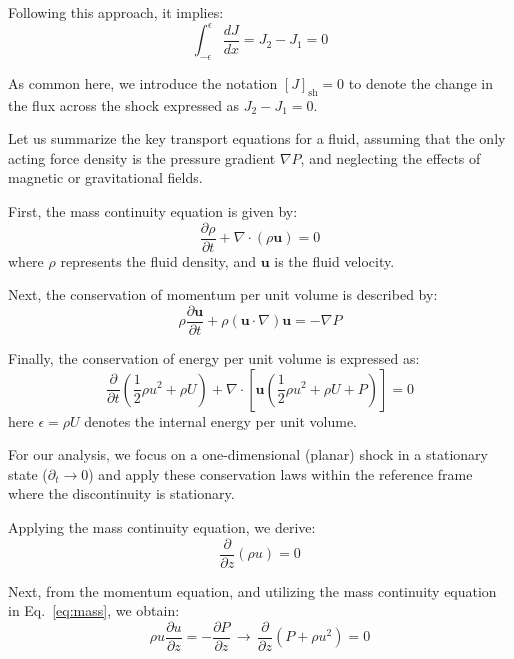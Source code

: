 Following this approach, it implies:
%
\begin{equation}
\int_{-\epsilon}^{\epsilon} \frac{dJ}{dx} = J_2 - J_1 = 0
\end{equation}

As common here, we introduce the notation \( [J]_{\text{sh}} = 0\) to denote the change in the flux across the shock expressed as \( J_2 - J_1 = 0 \). 

Let us summarize the key transport equations for a fluid, assuming that the only acting force density is the pressure gradient \( \nabla P \), and neglecting the effects of magnetic or gravitational fields.

First, the mass continuity equation is given by:
%
\begin{equation}
\frac{\partial \rho}{\partial t} + \nabla \cdot (\rho \mathbf{u}) = 0
\end{equation}
%
where \( \rho \) represents the fluid density, and \( \mathbf{u} \) is the fluid velocity.

Next, the conservation of momentum per unit volume is described by:
%
\begin{equation}
\rho \frac{\partial \mathbf{u}}{\partial t} + \rho (\mathbf{u} \cdot \nabla) \mathbf{u} = -\nabla P
\end{equation}

Finally, the conservation of energy per unit volume is expressed as:
%
\begin{equation}
\frac{\partial}{\partial t} \left( \frac{1}{2} \rho u^2 + \rho U \right) + \nabla \cdot \left[ \mathbf{u} \left( \frac{1}{2} \rho u^2 + \rho U + P \right) \right] = 0
\end{equation}
%
here \( \epsilon = \rho U \) denotes the internal energy per unit volume.

For our analysis, we focus on a one-dimensional (planar) shock in a stationary state (\( \partial_t \rightarrow 0 \)) and apply these conservation laws within the reference frame where the discontinuity is stationary.

Applying the mass continuity equation, we derive:
%
\begin{equation}\label{eq:mass}
\frac{\partial}{\partial z} (\rho u) = 0
\end{equation}

Next, from the momentum equation, and utilizing the mass continuity equation in Eq.~\ref{eq:mass}, we obtain:
%
\begin{equation}
\rho u \frac{\partial u}{\partial z} = -\frac{\partial P}{\partial z}  \, \rightarrow \, \frac{\partial}{\partial z} (P + \rho u^2) = 0 
\end{equation}

